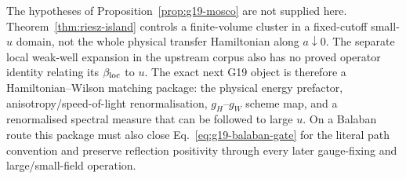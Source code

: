 The hypotheses of Proposition~\ref{prop:g19-mosco} are not supplied here.
Theorem~\ref{thm:riesz-island} controls a finite-volume cluster in a
fixed-cutoff small-$u$ domain, not the whole physical transfer Hamiltonian
along $a\downarrow0$.  The separate local weak-well expansion in the upstream
corpus also has no proved operator identity relating its $\beta_{\rm loc}$ to
$u$.  The exact next G19 object is therefore a Hamiltonian--Wilson matching
package: the physical energy prefactor, anisotropy/speed-of-light
renormalisation, $g_H$--$g_W$ scheme map, and a renormalised spectral measure
that can be followed to large $u$.  On a Balaban route this package must also
close Eq.~\eqref{eq:g19-balaban-gate} for the literal path convention and
preserve reflection positivity through every later gauge-fixing and
large/small-field operation.

